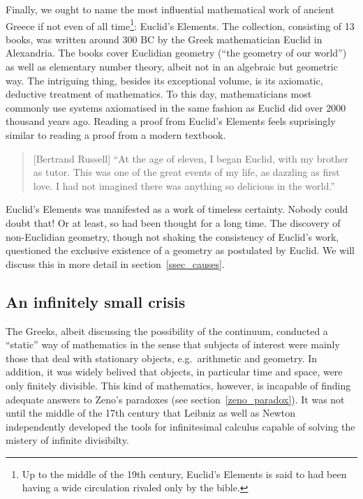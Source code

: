 \documentclass[hidelinks]{article}
\theoremstyle{plain}
\theoremstyle{definition}
\theoremstyle{rem}
\begin{document}
Finally, we ought to name the most influential mathematical work of ancient Greece if not even of all time\footnote{Up to the middle of the 19th century, Euclid's Elements is said to had been having a wide circulation rivaled only by the bible.}: Euclid's Elements. The collection, consisting of 13 books, was written around 300 BC by the Greek mathematician Euclid in Alexandria. The books cover Euclidian geometry (``the geometry of our world'') as well as elementary number theory, albeit not in an algebraic but geometric way. The intriguing thing, besides its exceptional volume, is its axiomatic, deductive treatment of mathematics. To this day, mathematicians most commonly use systems axiomatised in the same fashion as Euclid did over 2000 thousand years ago. Reading a proof from Euclid's Elements feels suprisingly similar to reading a proof from a modern textbook.
\begin{quote}[Bertrand Russell]
	``At the age of eleven, I began Euclid, with my brother as tutor. This was one of the great events of my life, as dazzling as first love. I had not imagined there was anything so delicious in the world.''\cite{russell_autobiography}
\end{quote}
Euclid's Elements was manifested as a work of timeless certainty. Nobody could doubt that! Or at least, so had been thought for a long time. The discovery of non-Euclidian geometry, though not shaking the consistency of Euclid's work, questioned the exclusive existence of a geometry as postulated by Euclid. We will discuss this in more detail in section~\ref{ssec_causes}.

\subsection{An infinitely small crisis}
The Greeks, albeit discussing the possibility of the continuum, conducted a ``static'' way of mathematics in the sense that subjects of interest were mainly those that deal with stationary objects, e.g.\ arithmetic and geometry. In addition, it was widely belived that objects, in particular time and space, were only finitely divisible. This kind of mathematics, however, is incapable of finding adequate answers to Zeno's paradoxes (see section~\ref{zeno_paradox}).
It was not until the middle of the 17th century that Leibniz as well as Newton independently developed the tools for infinitesimal calculus capable of solving the mistery of infinite divisibilty.
\end{document}
